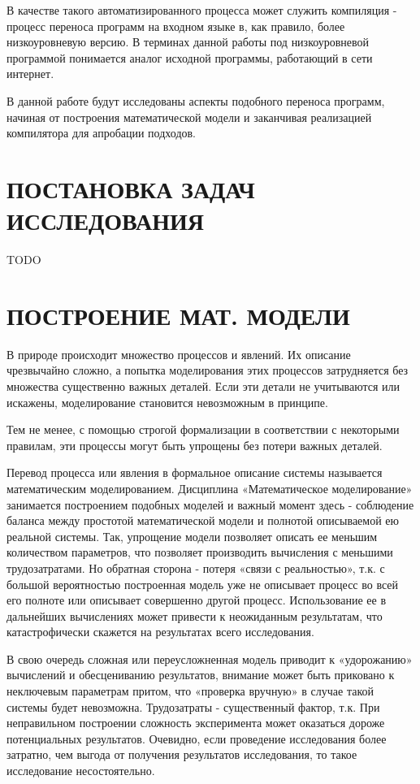 \documentclass[a4paper,14pt]{extreport} %
\begin{document}
В качестве такого автоматизированного процесса может служить
компиляция - процесс переноса программ на входном языке в, как
правило, более низкоуровневую версию. В терминах данной работы под низкоуровневой программой понимается аналог исходной программы, работающий в сети интернет.

В данной работе будут исследованы аспекты подобного переноса
программ, начиная от построения математической модели и заканчивая реализацией компилятора для апробации подходов.

\newpage



{\section{ПОСТАНОВКА ЗАДАЧ ИССЛЕДОВАНИЯ}}

TODO

\newpage


{\section[ПОСТРОЕНИЕ МАТЕМАТИЧЕСКОЙ МОДЕЛИ]{ПОСТРОЕНИЕ МАТ. МОДЕЛИ}}


	В природе происходит множество процессов и явлений. Их описание чрезвычайно сложно, а попытка моделирования этих процессов затрудняется без множества существенно важных деталей. Если эти детали не учитываются или искажены, моделирование становится невозможным в принципе.

	Тем не менее, с помощью строгой формализации в соответствии с некоторыми правилам, эти процессы могут быть упрощены без потери важных деталей.

	Перевод процесса или явления в формальное описание системы называется математическим моделированием. Дисциплина «Математическое моделирование» занимается построением подобных моделей и важный момент здесь - соблюдение баланса между простотой математической модели и полнотой описываемой ею реальной системы.
	Так, упрощение модели позволяет описать ее меньшим количеством параметров, что позволяет производить вычисления с меньшими трудозатратами. Но обратная сторона - потеря «связи с реальностью», т.к. с большой вероятностью построенная модель уже не описывает процесс во всей его полноте или описывает совершенно другой процесс. Использование ее в дальнейших вычислениях может привести к неожиданным результатам, что катастрофически скажется на результатах всего исследования.

	В свою очередь сложная или переусложненная модель приводит к «удорожанию» вычислений и обесцениванию результатов, внимание может быть приковано к неключевым параметрам притом, что «проверка вручную» в случае такой системы будет невозможна. Трудозатраты - существенный фактор, т.к. При неправильном построении сложность эксперимента может оказаться дороже потенциальных результатов. Очевидно, если проведение исследования более затратно, чем выгода от получения результатов исследования, то такое исследование несостоятельно.
\end{document}
